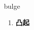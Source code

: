 
\begin{frame}
{\huge bulge}
\begin{center}
\begin{enumerate}\Large
  \item \textbf{凸起}
\end{enumerate}
\end{center}
\end{frame}
